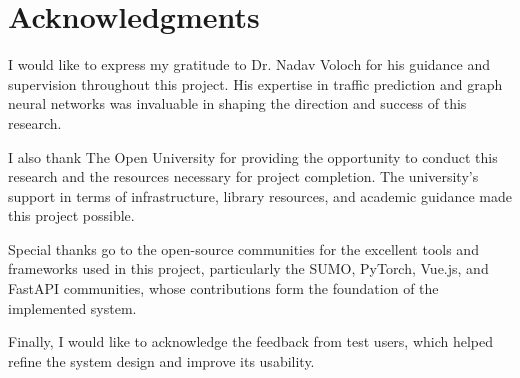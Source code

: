\section*{Acknowledgments}

I would like to express my gratitude to Dr. Nadav Voloch for his guidance and supervision throughout this project. His expertise in traffic prediction and graph neural networks was invaluable in shaping the direction and success of this research.

I also thank The Open University for providing the opportunity to conduct this research and the resources necessary for project completion. The university's support in terms of infrastructure, library resources, and academic guidance made this project possible.

Special thanks go to the open-source communities for the excellent tools and frameworks used in this project, particularly the SUMO, PyTorch, Vue.js, and FastAPI communities, whose contributions form the foundation of the implemented system.

Finally, I would like to acknowledge the feedback from test users, which helped refine the system design and improve its usability.

